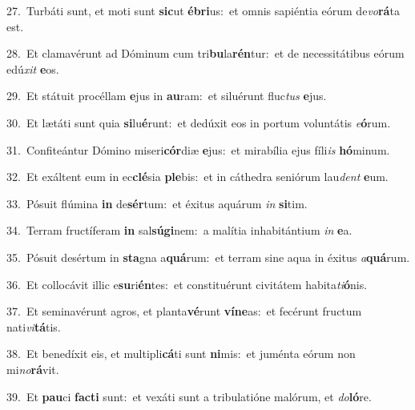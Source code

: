 {\numbfont\textcolor{\numbcolor}{27.}}~Turbáti sunt, et moti sunt \textbf{sic}\-ut \textbf{é}\-\textbf{bri}us:~\star et omnis sapiéntia eórum de\-\textit{vo}\-\textbf{rá}ta est.\par
{\numbfont\textcolor{\numbcolor}{28.}}~Et clamavérunt ad Dóminum cum tri\-\textbf{bu}\-la\-\textbf{rén}\-tur:~\star et de necessitátibus eórum edú\textit{xit} \textbf{e}\-os.\par
{\numbfont\textcolor{\numbcolor}{29.}}~Et státuit procéllam \textbf{e}\-jus in \textbf{au}\-ram:~\star et siluérunt fluc\textit{tus} \textbf{e}\-jus.\par
{\numbfont\textcolor{\numbcolor}{30.}}~Et lætáti sunt quia \textbf{si}\-lu\-\textbf{é}\-runt:~\star et dedúxit eos in portum voluntátis \textit{e}\-\textbf{ó}rum.\par
{\numbfont\textcolor{\numbcolor}{31.}}~Confiteántur Dómino miseri\-\textbf{cór}\-diæ \textbf{e}\-jus:~\star et mirabília ejus fíli\textit{is} \textbf{hó}\-minum.\par
{\numbfont\textcolor{\numbcolor}{32.}}~Et exáltent eum in ec\-\textbf{clé}\-sia \textbf{ple}\-bis:~\star et in cáthedra seniórum lau\textit{dent} \textbf{e}\-um.\par
{\numbfont\textcolor{\numbcolor}{33.}}~Pósuit flúmina \textbf{in} de\-\textbf{sér}\-tum:~\star et éxitus aquárum \textit{in} \textbf{si}\-tim.\par
{\numbfont\textcolor{\numbcolor}{34.}}~Terram fructíferam \textbf{in} sal\-\textbf{sú}\-\textbf{gi}nem:~\star a malítia inhabitántium \textit{in} \textbf{e}\-a.\par
{\numbfont\textcolor{\numbcolor}{35.}}~Pósuit desértum in \textbf{sta}\-gna a\-\textbf{quá}\-rum:~\star et terram sine aqua in éxitus \textit{a}\-\textbf{quá}rum.\par
{\numbfont\textcolor{\numbcolor}{36.}}~Et collocávit illic e\-\textbf{su}\-ri\-\textbf{én}\-tes:~\star et constituérunt civitátem habita\-\textit{ti}\-\textbf{ó}nis.\par
{\numbfont\textcolor{\numbcolor}{37.}}~Et seminavérunt agros, et planta\-\textbf{vé}\-runt \textbf{ví}\-\textbf{ne}as:~\star et fecérunt fructum nati\-\textit{vi}\-\textbf{tá}tis.\par
{\numbfont\textcolor{\numbcolor}{38.}}~Et benedíxit eis, et multipli\-\textbf{cá}\-ti sunt \textbf{ni}\-mis:~\star et juménta eórum non mi\-\textit{no}\-\textbf{rá}vit.\par
{\numbfont\textcolor{\numbcolor}{39.}}~Et \textbf{pau}\-ci \textbf{fac}\-\textbf{ti} sunt:~\star et vexáti sunt a tribulatióne malórum, et \textit{do}\-\textbf{ló}re.\par
